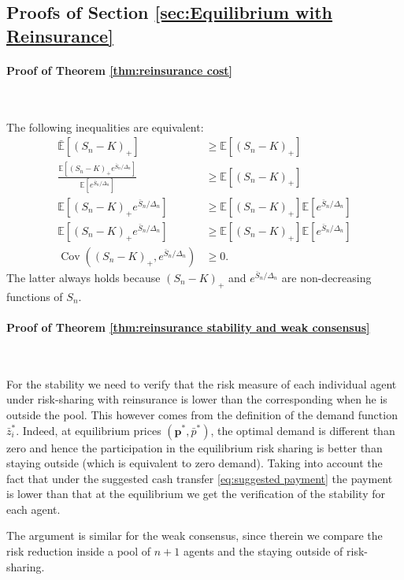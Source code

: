\documentclass[fleqn,mnsc,nonblindrev]{informs4}
\newcommand{\EE}{\mathbb{E}}
\newcommand{\Cov}{\operatorname{Cov}}
\newcommand{\tb}[1]{\textbf{#1}}
\begin{document}
\subsection{Proofs of Section \ref{sec:Equilibrium with Reinsurance}}
\paragraph{Proof of Theorem \ref{thm:reinsurance cost}}
\

The following inequalities are equivalent:
\begin{align*}
\bar{\EE}[(S_n-K)_+]&\geq \EE[(S_n-K)_+]\\
\frac{\EE[(S_n-K)_+e^{\bar{S}_n/\Delta_{n}}]}{\EE[e^{\bar{S}_n/\Delta_{n}}]}&\geq \EE[(S_n-K)_+]\\
\EE[(S_n-K)_+e^{\bar{S}_n/\Delta_{n}}]& \geq \EE[(S_n-K)_+]\EE[e^{\bar{S}_n/\Delta_{n}}]\\
\EE[(S_n-K)_+e^{\bar{S}_n/\Delta_{n}}]& \geq \EE[(S_n-K)_+]\EE[e^{\bar{S}_n/\Delta_{n}}]\\
\Cov((S_n-K)_+,e^{\bar{S}_n/\Delta_{n}})& \geq 0.
\end{align*}
The latter always holds because $(S_n-K)_+$ and $e^{\bar{S}_n/\Delta_{n}}$ are non-decreasing functions of $S_n$. 

\bigskip

\paragraph{Proof of Theorem \ref{thm:reinsurance stability and weak consensus}}
\

For the stability we need to verify that the risk measure of each individual agent under risk-sharing with reinsurance is lower than the corresponding when he is outside the pool. This however comes from the definition of the demand function $\bar{z}_i^*$. Indeed, at equilibrium prices $(\tb{p}^*,\bar{p}^*)$, the optimal demand is different than zero and hence the participation in the equilibrium risk sharing is better than staying outside (which is equivalent to zero demand). Taking into account the fact that under the suggested cash transfer \eqref{eq:suggested payment} the payment is lower than that at the equilibrium we get the verification of the stability for each agent. 

The argument is similar for the weak consensus, since therein we compare the risk reduction inside a pool of $n+1$ agents and the staying outside of risk-sharing. 
\bigskip
\end{document}
